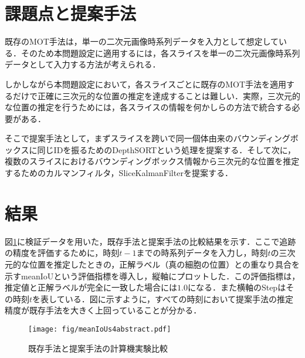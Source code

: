 \section{課題点と提案手法}


既存のMOT手法は，単一の二次元画像時系列データを入力として想定している．そのため本問題設定に適用するには，各スライスを単一の二次元画像時系列データとして入力する方法が考えられる．

しかしながら本問題設定において，各スライスごとに既存のMOT手法を適用するだけで正確に三次元的な位置の推定を達成することは難しい．実際，三次元的な位置の推定を行うためには，各スライスの情報を何かしらの方法で統合する必要がある．

そこで提案手法として，まずスライスを跨いで同一個体由来のバウンディングボックスに同じIDを振るためのDepthSORTという処理を提案する．そして次に，複数のスライスにおけるバウンディングボックス情報から三次元的な位置を推定するためのカルマンフィルタ，SliceKalmanFilterを提案する．

\section{結果}

図\ref{fig:meanIoUs}に検証データを用いた，既存手法と提案手法の比較結果を示す．ここで追跡の精度を評価するために，時刻$t-1$までの時系列データを入力し，時刻$t$の三次元的な位置を推定したときの，正解ラベル（真の細胞の位置）との重なり具合を示すmeanIoUという評価指標を導入し，縦軸にプロットした．この評価指標は，推定値と正解ラベルが完全に一致した場合には$1.0$になる．また横軸のStepはその時刻$t$を表している．図に示すように，すべての時刻において提案手法の推定精度が既存手法を大きく上回っていることが分かる．

\begin{figure}[h]
    \centering
    \texttt{[image: fig/meanIoUs4abstract.pdf]}
    \caption{既存手法と提案手法の計算機実験比較}
    \label{fig:meanIoUs}
\end{figure}
